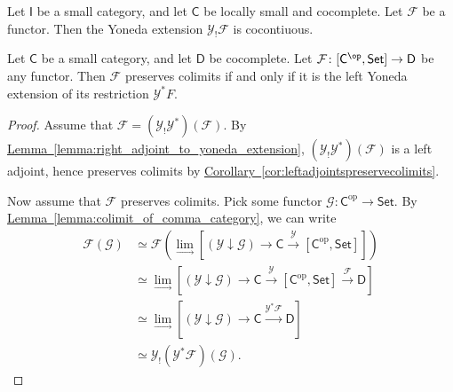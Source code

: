 \documentclass[notes.tex]{subfiles}
\begin{document}
\begin{corollary}
  \label{cor:yoneda_extension_results_in_cocontinuous_functor}
  Let $\mathsf{I}$ be a small category, and let $\mathsf{C}$ be locally small and cocomplete. Let $\mathcal{F}$ be a functor. Then the Yoneda extension $\mathcal{Y}_{!}\mathcal{F}$ is cocontiuous.
\end{corollary}

\begin{theorem}
  \label{thm:yoneda_extension_of_restriction_preserves_colimits}
  Let $\mathsf{C}$ be a small category, and let $\mathsf{D}$ be cocomplete. Let $\mathcal{F}\colon [\mathsf{C}^{\op}, \mathsf{Set}] \to \mathsf{D}$ be any functor. Then $\mathcal{F}$ preserves colimits if and only if it is the left Yoneda extension of its restriction $\mathcal{Y}^{*}F$.
\end{theorem}
\begin{proof}
  Assume that $\mathcal{F} = (\mathcal{Y}_{!}\mathcal{Y}^{*})(\mathcal{F})$. By \hyperref[lemma:right_adjoint_to_yoneda_extension]{Lemma~\ref*{lemma:right_adjoint_to_yoneda_extension}}, $(\mathcal{Y}_{!}\mathcal{Y}^{*})(\mathcal{F})$ is a left adjoint, hence preserves colimits by \hyperref[cor:leftadjointspreservecolimits]{Corollary~\ref*{cor:leftadjointspreservecolimits}}.
  
  Now assume that $\mathcal{F}$ preserves colimits. Pick some functor $\mathcal{G}\colon \mathsf{C}^{\mathrm{op}} \to \mathsf{Set}$. By \hyperref[lemma:colimit_of_comma_category]{Lemma~\ref*{lemma:colimit_of_comma_category}}, we can write
  \begin{align*}
    \mathcal{F}(\mathcal{G}) &\simeq \mathcal{F}\left( \lim_{\rightarrow}\left[ (\mathcal{Y} \downarrow \mathcal{G}) \to \mathsf{C} \overset{\mathcal{Y}}{\to} [\mathsf{C}^{\mathrm{op}}, \mathsf{Set}] \right] \right) \\
    &\simeq \lim_{\rightarrow} \left[ (\mathcal{Y} \downarrow \mathcal{G}) \to \mathsf{C} \overset{\mathcal{Y}}{\to} [\mathsf{C}^{\mathrm{op}}, \mathsf{Set}] \overset{\mathcal{F}}{\to} \mathsf{D} \right] \\
    &\simeq \lim_{\rightarrow} \left[ (\mathcal{Y} \downarrow \mathcal{G}) \to \mathsf{C} \overset{\mathcal{Y}^{*}\mathcal{F}}{\to} \mathsf{D} \right] \\
    &\simeq \mathcal{Y}_{!}(\mathcal{Y}^{*}\mathcal{F})(\mathcal{G}).
  \end{align*}
\end{proof}
\end{document}
